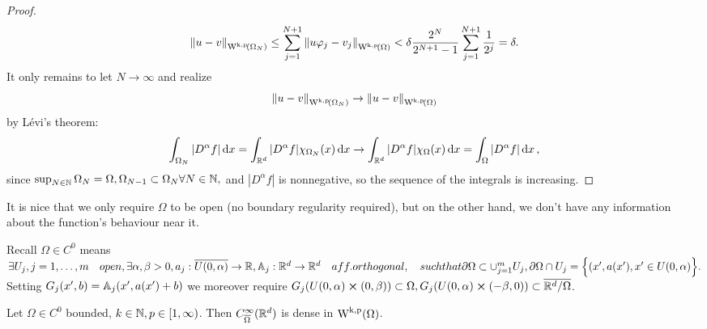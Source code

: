 \documentclass{article}
\begin{document}
\begin{proof}
	\begin{equation*}
		\norm{u-v}_{\WkpSet{\Omega_N}} \leq \sum_{j=1}^{N+1}\norm{u \varphi_j - v_j}_{\WkpSet{\Omega}} <\delta \frac{2^N}{2^{N+1}-1}\sum_{j=1}^{N+1} \frac{1}{2^j} = \delta.
	\end{equation*}
	It only remains to let $N \to \infty$ and realize
	\[
		\norm{u-v}_{\WkpSet{\Omega_N}} \to \norm{u-v}_{\WkpSet{\Omega}}
	\]
	by Lévi's theorem:
	\[
		\int_{\Omega_N}|D^\alpha f| \dd{x} = \int_{{\mathbb R}^d}|D^{\alpha}f|\chi_{\Omega_N}(x)\dd{x} \to \int_{{\mathbb R}^d}|D^\alpha f|\chi_{\Omega}(x)	\dd{x} = \int_{\Omega}|D^{\alpha}f|\dd{x},
	\]
	since $\sup_{N \in {\mathbb N}} \Omega_N = \Omega, \Omega_{N-1} \subset \Omega_{N} \forall N \in {\mathbb N},$ and $|D^{\alpha}f|$ is nonnegative, so the sequence of the integrals is increasing.
	 
\end{proof}

\begin{remark}
	It is nice that we only require $\Omega$ to be open (no boundary regularity required), but on the other hand, we don't have any information about the function's behaviour near it.
\end{remark}

Recall $\Omega \in C^{0}$ means $\exists U_j, j=1, \dots, m \quad{open}, \exists \alpha, \beta >0, a_j: \overline{U(0,\alpha)} \to {\mathbb R}, \mathbb{A}_j: {\mathbb R}^d \to {\mathbb R}^d \quad{aff. orthogonal}, \quad{such that} \partial \Omega \subset \cup_{j=1}^m U_j, \partial \Omega \cap U_j = \Big\{ (x',a(x'), x' \in U(0,\alpha)\Big\}.$ Setting $G_j(x',b) = \mathbb{A}_j(x',a(x')+b)$ we moreover require $G_j(U(0,\alpha) \cross (0,\beta)) \subset \Omega, G_j(U(0,\alpha) \cross (-\beta,0)) \subset \overline{{\mathbb R}^d / \Omega}$. 

\begin{theorem}
	Let $\Omega \in C^0$ bounded, $k \in {\mathbb N}, p \in [1,\infty)$. Then $C^\infty_{\overline{\Omega}}({\mathbb R}^d)$ is dense in $\WkpSet{\Omega}$.


\end{theorem}
\end{document}
